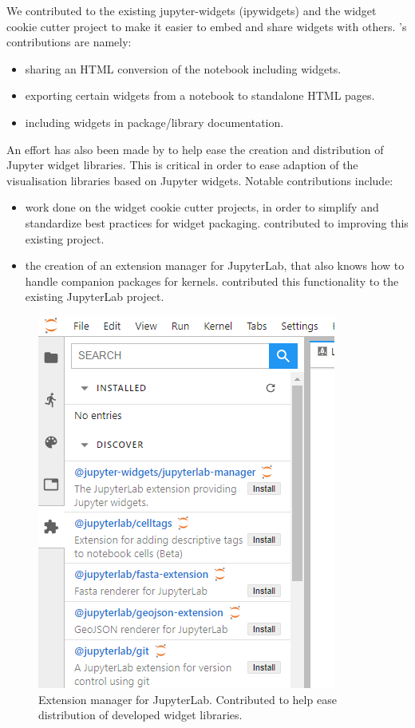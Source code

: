 \documentclass{deliverablereport}
\begin{document}
We contributed to the existing jupyter-widgets (ipywidgets) and the widget cookie
cutter project to make it easier to embed and share widgets with
others. \ODK's contributions are namely:

\begin{itemize}
\item sharing an HTML conversion of the notebook including widgets.
\item exporting certain widgets from a notebook to standalone HTML pages.
\item including widgets in package/library documentation.
\end{itemize}

An effort has also been made by \ODK to help ease the creation and distribution of Jupyter widget libraries. This is critical in order to ease adaption of the visualisation libraries based on Jupyter widgets. Notable contributions include:
\begin{itemize}
\item work done on the widget cookie cutter projects, in order to simplify and standardize best practices for widget packaging. \ODK contributed to improving this existing project.
\item the creation of an extension manager for JupyterLab, that also knows how to handle companion packages for kernels. \ODK contributed this functionality to the existing JupyterLab project.
\end{itemize}

\begin{figure}
  \centering
  \includegraphics[scale=0.6]{lab-extmngr.png}
  \caption{Extension manager for JupyterLab. Contributed to help ease distribution of developed widget libraries.}
\end{figure}
\end{document}
